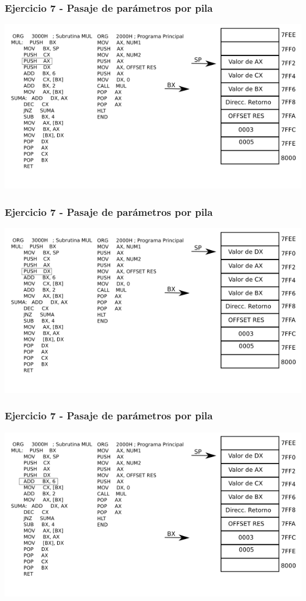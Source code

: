 \documentclass{beamer}
\begin{document}
\begin{frame}
  \frametitle{Ejercicio 7 - Pasaje de parámetros por pila}
\includegraphics[scale=0.70]{imgs/imagen_009.png}
\end{frame}
\begin{frame}
\frametitle{Ejercicio 7 - Pasaje de parámetros por pila}
\includegraphics[scale=0.70]{imgs/imagen_010.png}
\end{frame}

\begin{frame}
\frametitle{Ejercicio 7 - Pasaje de parámetros por pila}
\includegraphics[scale=0.70]{imgs/imagen_011.png}
\end{frame}
\end{document}

